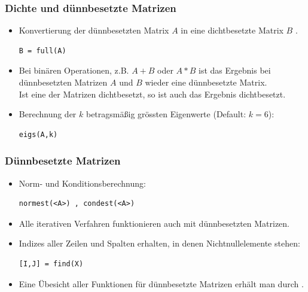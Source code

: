 \documentclass[hyperref={xetex}]{beamer}
\begin{document}
% 
%
\begin{frame}[fragile]\frametitle{Dichte und d\"unnbesetzte Matrizen}
\begin{itemize}
\item Konvertierung der d\"unnbesetzten Matrix $A$ in eine dichtbesetzte Matrix $B$ .
\begin{lstlisting}
B = full(A)
\end{lstlisting}
\item Bei bin\"aren Operationen, z.B. $A+B$ oder $A*B$ ist das Ergebnis
  bei d\"unnbesetzten Matrizen $A$ und $B$ wieder eine d\"unnbesetzte
  Matrix. \\Ist eine der Matrizen dichtbesetzt, so ist auch das Ergebnis
  dichtbesetzt. 
\item Berechnung der $k$ betragsm\"a{\ss}ig  gr\"ossten Eigenwerte (Default: $k=6$):
\begin{lstlisting}
eigs(A,k) 
\end{lstlisting}

\end{itemize}
\end{frame}
% 
%
\begin{frame}[fragile]\frametitle{D\"unnbesetzte Matrizen}
\begin{itemize}
\item Norm- und Konditionsberechnung:
\begin{lstlisting}
normest(<A>) , condest(<A>)
\end{lstlisting}

\item Alle iterativen Verfahren funktionieren auch mit d\"unnbesetzten
  Matrizen. 
\item Indizes aller Zeilen und Spalten erhalten, in denen Nichtnullelemente stehen: 
\begin{lstlisting}
[I,J] = find(X)
\end{lstlisting}
\item Eine \"Ubesicht aller Funktionen f\"ur d\"unnbesetzte Matrizen erh\"alt
  man durch \alert{ }.  
\end{itemize}
\end{frame}
\end{document}

